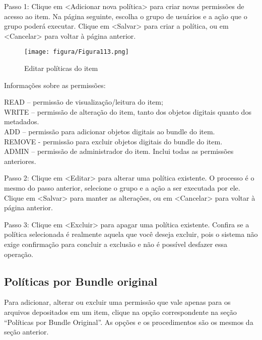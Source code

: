 \documentclass[12pt,hidelinks]{article}
\begin{document}
    Passo 1: Clique em <Adicionar nova política> para criar novas permissões de acesso ao item. Na página seguinte, escolha o grupo de usuários e a ação que o grupo poderá executar. Clique em <Salvar> para criar a política, ou em <Cancelar> para voltar à página anterior.
    
    \begin{figure}[!htp]
                \centering
                \texttt{[image: figura/Figura113.png]}
                \caption{Editar políticas do item}
            \label{Rotulo}
        \end{figure}
        
\newpage

    Informações sobre as permissões:
    
    \singlespacing
    
    READ – permissão de visualização/leitura do item; \\
    WRITE – permissão de alteração do item, tanto dos objetos digitais quanto dos metadados. \\
    ADD – permissão para adicionar objetos digitais ao bundle do item. \\
    REMOVE - permissão para excluir objetos digitais do bundle do item. \\
    ADMIN – permissão de administrador do item. Inclui todas as permissões anteriores.
    
    Passo 2: Clique em <Editar> para alterar uma política existente. O processo é o mesmo do passo anterior, selecione o grupo e a ação a ser executada por ele. Clique em <Salvar> para manter as alterações, ou em <Cancelar> para voltar à página anterior.
    
    \singlespacing
    
    Passo 3: Clique em <Excluir> para apagar uma política existente. Confira se a política selecionada é realmente aquela que você deseja excluir, pois o sistema não exige confirmação para concluir a exclusão e não é possível desfazer essa operação.
    
    \subsection{Políticas por Bundle original}
    
    \singlespacing
    
    Para adicionar, alterar ou excluir uma permissão que vale apenas para os arquivos depositados em um item, clique na opção correspondente na seção “Políticas por Bundle Original”. As opções e os procedimentos são os mesmos da seção anterior.
    
\end{document}
